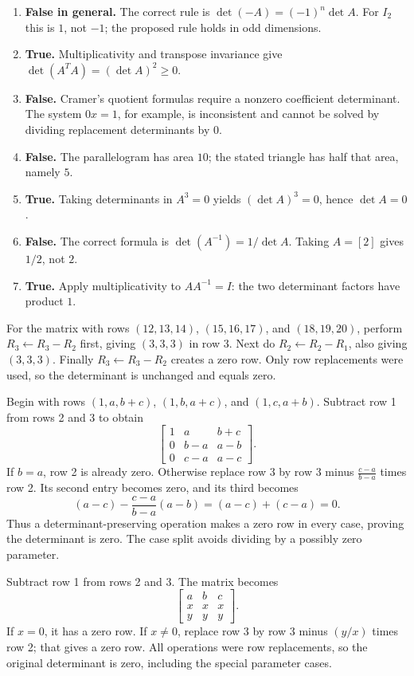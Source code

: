 \begin{enumerate}[label=(\alph*)]
\item \textbf{False in general.} The correct rule is $\det(-A)=(-1)^n\det A$. For $I_2$ this is $1$, not $-1$; the proposed rule holds in odd dimensions.
\item \textbf{True.} Multiplicativity and transpose invariance give $\det(A^TA)=(\det A)^2\ge0$.
\item \textbf{False.} Cramer's quotient formulas require a nonzero coefficient determinant. The system $0x=1$, for example, is inconsistent and cannot be solved by dividing replacement determinants by $0$.
\item \textbf{False.} The parallelogram has area $10$; the stated triangle has half that area, namely $5$.
\item \textbf{True.} Taking determinants in $A^3=0$ yields $(\det A)^3=0$, hence $\det A=0$.
\item \textbf{False.} The correct formula is $\det(A^{-1})=1/\det A$. Taking $A=[2]$ gives $1/2$, not $2$.
\item \textbf{True.} Apply multiplicativity to $AA^{-1}=I$: the two determinant factors have product $1$.
\end{enumerate}

For the matrix with rows $(12,13,14)$, $(15,16,17)$, and $(18,19,20)$, perform $R_3\leftarrow R_3-R_2$ first, giving $(3,3,3)$ in row 3. Next do $R_2\leftarrow R_2-R_1$, also giving $(3,3,3)$. Finally $R_3\leftarrow R_3-R_2$ creates a zero row. Only row replacements were used, so the determinant is unchanged and equals zero.

Begin with rows $(1,a,b+c)$, $(1,b,a+c)$, and $(1,c,a+b)$. Subtract row 1 from rows 2 and 3 to obtain
\[
\begin{bmatrix}1&a&b+c\\0&b-a&a-b\\0&c-a&a-c\end{bmatrix}.
\]
If $b=a$, row 2 is already zero. Otherwise replace row 3 by row 3 minus $\frac{c-a}{b-a}$ times row 2. Its second entry becomes zero, and its third becomes
\[
(a-c)-\frac{c-a}{b-a}(a-b)=(a-c)+(c-a)=0.
\]
Thus a determinant-preserving operation makes a zero row in every case, proving the determinant is zero. The case split avoids dividing by a possibly zero parameter.

Subtract row 1 from rows 2 and 3. The matrix becomes
\[
\begin{bmatrix}a&b&c\\x&x&x\\y&y&y\end{bmatrix}.
\]
If $x=0$, it has a zero row. If $x\ne0$, replace row 3 by row 3 minus $(y/x)$ times row 2; that gives a zero row. All operations were row replacements, so the original determinant is zero, including the special parameter cases.

